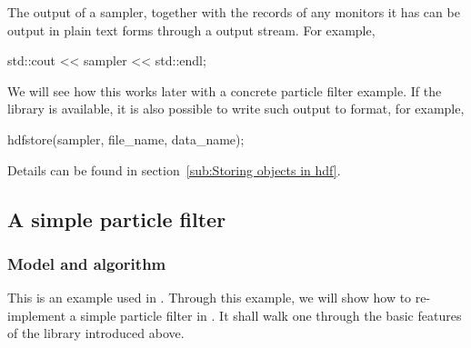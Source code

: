 \documentclass[11pt,bib,mint,hyper,altcolor]{marticle}
\begin{document}
The output of a sampler, together with the records of any monitors it has can
be output in plain text forms through a \cpp output stream. For example,
\begin{cppcode}
  std::cout << sampler << std::endl;
\end{cppcode}
We will see how this works later with a concrete particle filter example. If
the \hdf library is available, it is also possible to write such output to \hdf
format, for example,
\begin{cppcode}
  hdfstore(sampler, file_name, data_name);
\end{cppcode}
Details can be found in section~\ref{sub:Storing objects in hdf}.

\subsection{A simple particle filter}
\label{sub:A simple particle filter}

\subsubsection{Model and algorithm}
\label{ssub:Model and algorithm}

This is an example used in \textcite{Johansen:2009wd}. Through this example, we
will show how to re-implement a simple particle filter in \vsmc. It shall walk
one through the basic features of the library introduced above.
\end{document}
